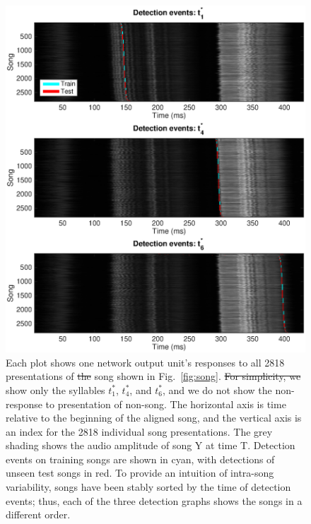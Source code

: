 \documentclass[10pt,letterpaper]{article}
\newcommand\fig[1]{Fig.~\ref{#1}}
\providecommand{\DIFaddtex}[1]{{\protect\color{blue}\uwave{#1}}} %
\providecommand{\DIFdeltex}[1]{{\protect\color{red}\sout{#1}}}                      %
\providecommand{\DIFaddFL}[1]{\DIFadd{#1}} %
\providecommand{\DIFdelFL}[1]{\DIFdel{#1}} %
\providecommand{\DIFaddbeginFL}{} %
\providecommand{\DIFaddendFL}{} %
\providecommand{\DIFdelbeginFL}{} %
\providecommand{\DIFdelendFL}{} %
\providecommand{\DIFadd}[1]{\texorpdfstring{\DIFaddtex{#1}}{#1}} %
\providecommand{\DIFdel}[1]{\texorpdfstring{\DIFdeltex{#1}}{}} %
\begin{document}
\begin{figure}
  \includegraphics[width=\textwidth]{Fig2}
  \caption{Each plot shows one network output unit's responses to all
    2818 presentations of \DIFdelbeginFL \DIFdelFL{the }\DIFdelendFL \DIFaddbeginFL \DIFaddFL{lny64's }\DIFaddendFL song shown in \fig{fig:song}.  \DIFdelbeginFL \DIFdelFL{For
    simplicity, we }\DIFdelendFL \DIFaddbeginFL \DIFaddFL{We
    }\DIFaddendFL show only the syllables $t^*_1$, $t^*_4$, and $t^*_6$, and we do
    not show the non-response to presentation of non-song. The
    horizontal axis is time relative to the beginning of the aligned
    song, and the vertical axis is an index for the 2818 individual
    song presentations. The grey shading shows the audio amplitude of
    song Y at time T. Detection events on training songs are shown in
    cyan, with detections of unseen test songs in red.  To provide an
    intuition of intra-song variability, songs have been stably sorted
    by the time of detection events; thus, each of the three detection
    graphs shows the songs in a different order.}
  \label{fig:detection_raster}
\end{figure}
\end{document}
